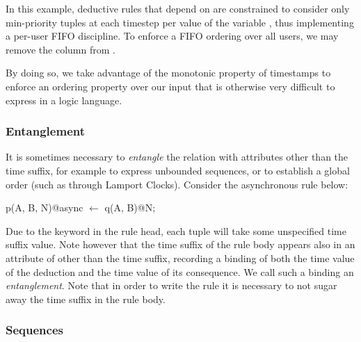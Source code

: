 In this example, deductive rules that depend on 
are constrained to consider only min-priority tuples at each timestep per value
of the variable , thus implementing a per-user FIFO discipline.  To
enforce a FIFO ordering over all users, we may remove the  column
from .


By doing so, we take advantage of the monotonic property of timestamps to enforce an ordering property over our input that is otherwise 
very difficult to express in a logic language.


\subsubsection{Entanglement}
\label{sec:entangle}

It is sometimes necessary to {\em entangle} the  relation
with attributes other than the time suffix, for example to express unbounded
sequences, or to establish a global order (such as through Lamport Clocks).
Consider the asynchronous rule below:

\begin{Dedalus}
p(A, B, N)@async \(\leftarrow\)
  q(A, B)@N;
\end{Dedalus}
\noindent

Due to the  keyword in the rule head, each  tuple
will take some unspecified time suffix value.  Note however that the time
suffix  of the rule body appears also in an attribute of 
other than the time suffix, recording a binding of both the time value of the
deduction and the time value of its consequence.  We call such a binding an
{\em entanglement}.   Note that in order to write the rule it is necessary to
not sugar away the time suffix in the rule body.  


\subsubsection{Sequences}

